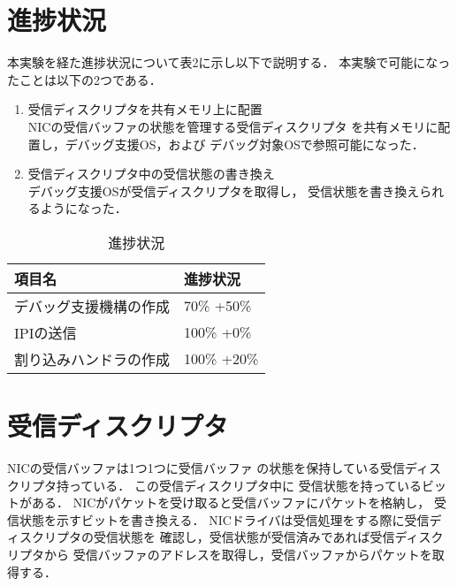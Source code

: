 \documentclass[12pt]{jsarticle}
\begin{document}
\section{進捗状況}
本実験を経た進捗状況について表2に示し以下で説明する．
本実験で可能になったことは以下の2つである．
\begin{enumerate}
    \item 受信ディスクリプタを共有メモリ上に配置\\
        NICの受信バッファの状態を管理する受信ディスクリプタ
        を共有メモリに配置し，デバッグ支援OS，および
        デバッグ対象OSで参照可能になった．
    \item 受信ディスクリプタ中の受信状態の書き換え\\
        デバッグ支援OSが受信ディスクリプタを取得し，
        受信状態を書き換えられるようになった．
\end{enumerate}

\begin{table}[htbp]
\caption{進捗状況}
\label{kankyou}
\begin{center}
\begin{tabular}{l|l}   \hline 
項目名                          & 進捗状況    \\  \hline
デバッグ支援機構の作成          & 70\% +50\%  \\ 
IPIの送信                       & 100\% +0\% \\ 
割り込みハンドラの作成          & 100\% +20\%    \\ 
           
\end{tabular}
\end{center}
\end{table}

\section{受信ディスクリプタ}\label{descriptor}
NICの受信バッファは1つ1つに受信バッファ
の状態を保持している受信ディスクリプタ持っている．
この受信ディスクリプタ中に
受信状態を持っているビットがある．
NICがパケットを受け取ると受信バッファにパケットを格納し，
受信状態を示すビットを書き換える．
NICドライバは受信処理をする際に受信ディスクリプタの受信状態を
確認し，受信状態が受信済みであれば受信ディスクリプタから
受信バッファのアドレスを取得し，受信バッファからパケットを取得する．
\end{document}
